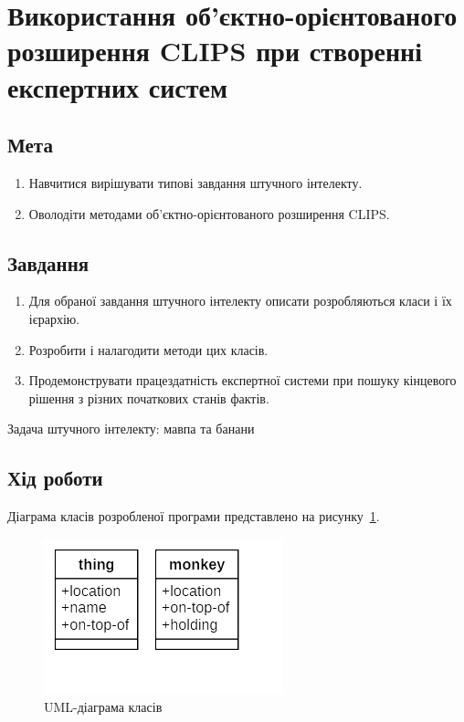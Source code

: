 



\newcommand{\labnumber}{5} %



\lstset{language=CLIPS}
\graphicspath{{figures/}}


\Ukrainian


\addtocounter{page}{1}

\section*{Використання об'єктно-орієнтованого розширення CLIPS при створенні експертних систем}
\subsection*{Мета}
\begin{enumerate}
	\item Навчитися вирішувати типові завдання штучного інтелекту.
	\item Оволодіти методами об'єктно-орієнтованого розширення CLIPS.
\end{enumerate}

\subsection*{Завдання}
\begin{enumerate}
	\item Для обраної завдання штучного інтелекту описати розробляються класи і їх ієрархію.
	\item Розробити і налагодити методи цих класів.
	\item Продемонструвати працездатність експертної системи при пошуку кінцевого рішення з різних початкових станів фактів.
\end{enumerate}

\begin{center}
	Задача штучного інтелекту: мавпа та банани
\end{center}

\subsection*{Хід роботи}
Діаграма класів розробленої програми представлено на рисунку~\ref{fig:uml_class}.

\begin{figure}[H]
	\centering
	    \includegraphics{uml_class}
	\caption{UML-діаграма класів}
	\label{fig:uml_class}
\end{figure}

